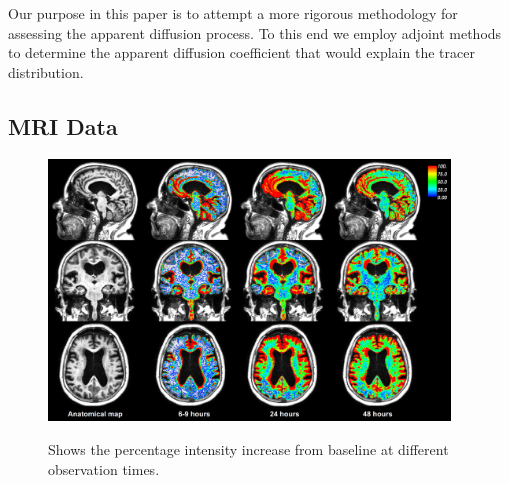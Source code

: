 \documentclass[11pt,a4paper]{article}
\begin{document}
Our purpose in this paper is to attempt a more rigorous methodology 
for assessing the apparent diffusion process. To this end we employ
adjoint methods to determine the apparent diffusion coefficient 
that would explain the tracer distribution.  
  



\subsection*{MRI Data}
\begin{figure}
\includegraphics[width=0.95\textwidth]{PatID-68-new-100.png} 
\label{fig1} 
\caption{Shows the percentage intensity increase from baseline at different observation times. }
\end{figure}
\end{document}
